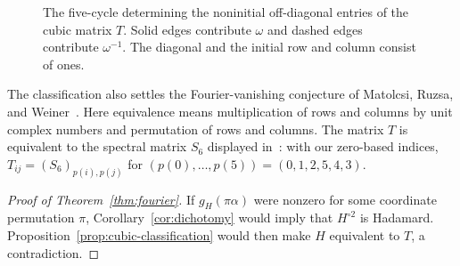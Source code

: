 \begin{figure}[htbp]
\centering
{}
\caption{The five-cycle determining the noninitial off-diagonal entries
of the cubic matrix $T$. Solid edges contribute $\omega$ and dashed edges
contribute $\omega^{-1}$. The diagonal and the initial row and column
consist of ones.}
\label{fig:cubic-cycle}
\end{figure}

The classification also settles the Fourier-vanishing conjecture of
Matolcsi, Ruzsa, and Weiner~\cite[Conjecture~2.3]{MatolcsiRuzsaWeiner2013}.
Here equivalence means multiplication of rows and columns by unit
complex numbers and permutation of rows and columns. The matrix $T$ is
equivalent to the spectral matrix $S_6$ displayed
in~\cite[(93)--(94)]{TadejZyczkowski2006}: with our zero-based indices,
$T_{ij}=(S_6)_{p(i),p(j)}$ for
$(p(0),\ldots,p(5))=(0,1,2,5,4,3)$.

\begin{proof}[Proof of Theorem~\ref{thm:fourier}]
If $g_H(\pi\alpha)$ were nonzero for some coordinate permutation $\pi$,
Corollary~\ref{cor:dichotomy} would imply that $H^{\circ2}$ is
Hadamard. Proposition~\ref{prop:cubic-classification} would then make
$H$ equivalent to $T$, a contradiction.
\end{proof}

